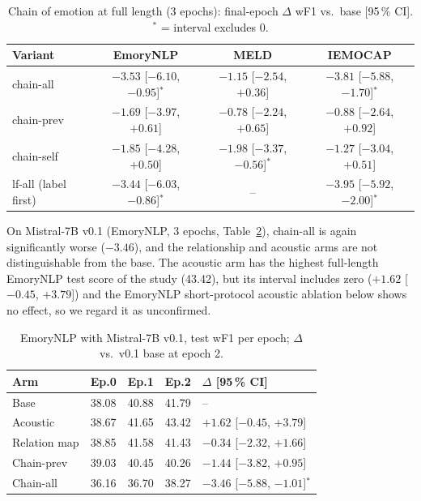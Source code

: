 \documentclass[lettersize,journal]{IEEEtran}
\begin{document}
\begin{table}[!t]
\caption{Chain of emotion at full length (3 epochs): final-epoch $\Delta$ wF1 vs.\ base [95\,\% CI]. $^{*}$ = interval excludes 0.}\label{tab:chain}
\centering\small
\begin{tabular}{lccc}
\toprule
Variant & EmoryNLP & MELD & IEMOCAP\\
\midrule
chain-all & $-3.53$ [$-6.10$, $-0.95$]$^{*}$ & $-1.15$ [$-2.54$, $+0.36$] & $-3.81$ [$-5.88$, $-1.70$]$^{*}$\\
chain-prev & $-1.69$ [$-3.97$, $+0.61$] & $-0.78$ [$-2.24$, $+0.65$] & $-0.88$ [$-2.64$, $+0.92$]\\
chain-self & $-1.85$ [$-4.28$, $+0.50$] & $-1.98$ [$-3.37$, $-0.56$]$^{*}$ & $-1.27$ [$-3.04$, $+0.51$]\\
lf-all (label first) & $-3.44$ [$-6.03$, $-0.86$]$^{*}$ & -- & $-3.95$ [$-5.92$, $-2.00$]$^{*}$\\
\bottomrule
\end{tabular}
\end{table}

On Mistral-7B v0.1 (EmoryNLP, 3 epochs, Table~\ref{tab:v01}), chain-all is again significantly worse ($-3.46$), and the relationship and acoustic arms are not distinguishable from the base. The acoustic arm has the highest full-length EmoryNLP test score of the study (43.42), but its interval includes zero ($+1.62$ [$-0.45$, $+3.79$]) and the EmoryNLP short-protocol acoustic ablation below shows no effect, so we regard it as unconfirmed.

\begin{table}[!t]
\caption{EmoryNLP with Mistral-7B v0.1, test wF1 per epoch; $\Delta$ vs.\ v0.1 base at epoch 2.}\label{tab:v01}
\centering\small
\begin{tabular}{lcccl}
\toprule
Arm & Ep.0 & Ep.1 & Ep.2 & $\Delta$ [95\,\% CI]\\
\midrule
Base & 38.08 & 40.88 & 41.79 & --\\
Acoustic & 38.67 & 41.65 & 43.42 & $+1.62$ [$-0.45$, $+3.79$]\\
Relation map & 38.85 & 41.58 & 41.43 & $-0.34$ [$-2.32$, $+1.66$]\\
Chain-prev & 39.03 & 40.45 & 40.26 & $-1.44$ [$-3.82$, $+0.95$]\\
Chain-all & 36.16 & 36.70 & 38.27 & $-3.46$ [$-5.88$, $-1.01$]$^{*}$\\
\bottomrule
\end{tabular}
\end{table}
\end{document}
